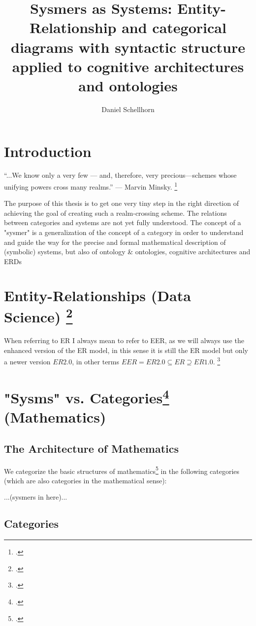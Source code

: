 \documentclass[12pt,a4paper]{article}
\title{Sysmers as Systems: Entity-Relationship and categorical diagrams with syntactic structure applied to cognitive architectures and ontologies}
\author{Daniel Schellhorn}
\begin{document}
\maketitle

\section*{Introduction}
“...We know only a very few — and, therefore, very precious—schemes whose unifying powers cross many realms.” — Marvin Minsky. \footcite[?]{Minsky1988}
\newline

The purpose of this thesis is to get one very tiny step in the right direction of achieving the goal of creating such a realm-crossing scheme. The relations between categories and systems are not yet fully understood. The concept of a "sysmer" is a generalization of the concept of a category in order to understand and guide the way for the precise and formal mathematical description of (symbolic) systems, but also of ontology \& ontologies, cognitive architectures and ERDs
\section{Entity-Relationships (Data Science) \footcite{ElmasriNavathe2015}}

When referring to ER I always mean to refer to EER, as we will always use the enhanced version of the ER model, in this sense it is still the ER model but only a newer version $ER 2.0$, in other terms $EER = ER 2.0 \subseteq ER \supseteq ER 1.0 $. \footcite[107]{ElmasriNavathe2015}

\section{"Sysms" vs. Categories\footcite{MacLane1997} (Mathematics)}

\subsection{The Architecture of Mathematics}
We categorize the basic structures of mathematics\footcite[68]{Basieux2000} in the following categories (which are also categories in the mathematical sense):

...(sysmers in here)...

\subsection{Categories}
\end{document}
